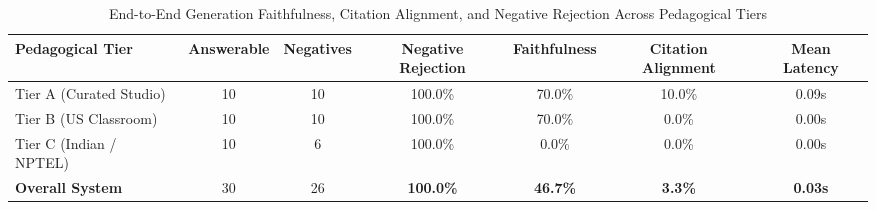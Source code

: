 \begin{table}[t]
\caption{End-to-End Generation Faithfulness, Citation Alignment, and Negative Rejection Across Pedagogical Tiers}
\label{tab:generation_eval}
\centering
\begin{tabular}{lcccccc}
\hline
\textbf{Pedagogical Tier} & \textbf{Answerable} & \textbf{Negatives} & \textbf{Negative Rejection} & \textbf{Faithfulness} & \textbf{Citation Alignment} & \textbf{Mean Latency} \\
\hline
Tier A (Curated Studio) & 10 & 10 & 100.0\% & 70.0\% & 10.0\% & 0.09s \\
Tier B (US Classroom) & 10 & 10 & 100.0\% & 70.0\% & 0.0\% & 0.00s \\
Tier C (Indian / NPTEL) & 10 & 6 & 100.0\% & 0.0\% & 0.0\% & 0.00s \\
\textbf{Overall System} & 30 & 26 & \textbf{100.0\%} & \textbf{46.7\%} & \textbf{3.3\%} & \textbf{0.03s} \\
\hline
\end{tabular}
\end{table}
